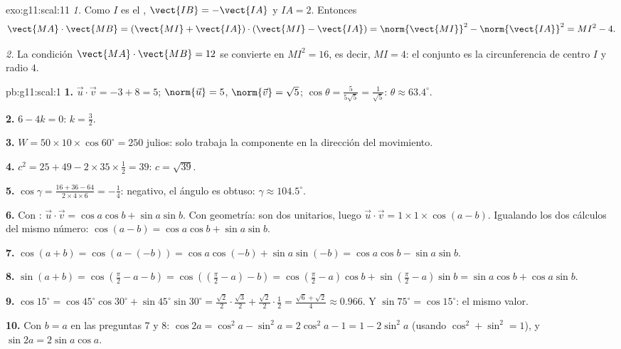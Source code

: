 \begin{solution}{exo:g11:scal:11}
\emph{1.} Como $I$ es el , $\vect{IB} = -\vect{IA}$ y
$IA = 2$. Entonces
\[
\vect{MA}\cdot\vect{MB}
= (\vect{MI} + \vect{IA})\cdot(\vect{MI} - \vect{IA})
= \norm{\vect{MI}}^2 - \norm{\vect{IA}}^2
= MI^2 - 4 .
\]

\emph{2.} La condición $\vect{MA}\cdot\vect{MB} = 12$ se convierte en
$MI^2 = 16$, es decir, $MI = 4$: el conjunto es la circunferencia de
centro $I$ y radio $4$.
\end{solution}

\begin{solution}{pb:g11:scal:1}
\textbf{1.} $\vec u \cdot \vec v = -3 + 8 = 5$; $\norm{\vec u} = 5$,
$\norm{\vec v} = \sqrt5$; $\cos\theta = \frac{5}{5\sqrt5} =
\frac{1}{\sqrt5}$: $\theta \approx 63.4^\circ$.

\textbf{2.} $6 - 4k = 0$: $k = \frac32$.

\textbf{3.} $W = 50 \times 10 \times \cos 60^\circ = 250$ julios: solo
trabaja la componente en la dirección del movimiento.

\textbf{4.} $c^2 = 25 + 49 - 2 \times 35 \times \frac12 = 39$:
$c = \sqrt{39}$.

\textbf{5.} $\cos\gamma = \frac{16 + 36 - 64}{2 \times 4 \times 6} =
-\frac14$: negativo, el ángulo es obtuso:
$\gamma \approx 104.5^\circ$.

\textbf{6.} Con :
$\vec u \cdot \vec v = \cos a \cos b + \sin a \sin b$. Con geometría: son
dos  unitarios, luego
$\vec u \cdot \vec v = 1 \times 1 \times \cos(a - b)$. Igualando los dos
cálculos del mismo número:
$\cos(a - b) = \cos a \cos b + \sin a \sin b$.

\textbf{7.} $\cos(a + b) = \cos(a - (-b)) = \cos a \cos(-b) +
\sin a \sin(-b) = \cos a \cos b - \sin a \sin b$.

\textbf{8.} $\sin(a + b) = \cos\left(\frac\pi2 - a - b\right)
= \cos\left(\left(\frac\pi2 - a\right) - b\right)
= \cos\left(\frac\pi2 - a\right)\cos b +
\sin\left(\frac\pi2 - a\right)\sin b
= \sin a \cos b + \cos a \sin b$.

\textbf{9.} $\cos 15^\circ = \cos 45^\circ \cos 30^\circ +
\sin 45^\circ \sin 30^\circ = \frac{\sqrt2}{2} \cdot
\frac{\sqrt3}{2} + \frac{\sqrt2}{2} \cdot \frac12 =
\frac{\sqrt6 + \sqrt2}{4} \approx 0.966$. Y
$\sin 75^\circ = \cos 15^\circ$: el mismo valor.

\textbf{10.} Con $b = a$ en las preguntas 7 y 8:
$\cos 2a = \cos^2 a - \sin^2 a = 2\cos^2 a - 1 = 1 - 2\sin^2 a$ (usando
$\cos^2 + \sin^2 = 1$), y $\sin 2a = 2 \sin a \cos a$.


\end{solution}
